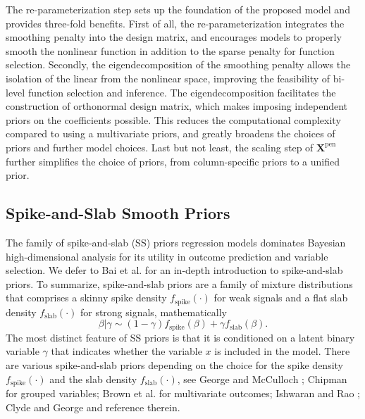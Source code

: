 \documentclass[AMA,STIX1COL,]{WileyNJD-v2}
\begin{document}
The re-parameterization step sets up the foundation of the proposed
model and provides three-fold benefits. First of all, the
re-parameterization integrates the smoothing penalty into the design
matrix, and encourages models to properly smooth the nonlinear function
in addition to the sparse penalty for function selection. Secondly, the
eigendecomposition of the smoothing penalty allows the isolation of the
linear from the nonlinear space, improving the feasibility of bi-level
function selection and inference. The eigendecomposition facilitates the
construction of orthonormal design matrix, which makes imposing
independent priors on the coefficients possible. This reduces the
computational complexity compared to using a multivariate priors, and
greatly broadens the choices of priors and further model choices. Last
but not least, the scaling step of \(\boldsymbol{X}^\text{pen}\) further
simplifies the choice of priors, from column-specific priors to a
unified prior.

\hypertarget{spike-and-slab-smooth-priors}{%
\subsection{Spike-and-Slab Smooth
Priors}\label{spike-and-slab-smooth-priors}}

The family of spike-and-slab (SS) priors regression models dominates
Bayesian high-dimensional analysis for its utility in outcome prediction
and variable selection. We defer to Bai et al. \citep{Bai2021Review} for
an in-depth introduction to spike-and-slab priors. To summarize,
spike-and-slab priors are a family of mixture distributions that
comprises a skinny spike density \(f_{\text{spike}}(\cdot)\) for weak
signals and a flat slab density \(f_{\text{slab}}(\cdot)\) for strong
signals, mathematically \[
 \beta|\gamma \sim (1-\gamma)f_{\text{spike}}(\beta) + \gamma f_{\text{slab}}(\beta).
\] The most distinct feature of SS priors is that it is conditioned on a
latent binary variable \(\gamma\) that indicates whether the variable
\(x\) is included in the model. There are various spike-and-slab priors
depending on the choice for the spike density
\(f_{\text{spike}}(\cdot)\) and the slab density
\(f_{\text{slab}}(\cdot)\), see George and McCulloch
\citep{George1993, George1997}; Chipman \citep{Chipman1996} for grouped
variables; Brown et al. \citep{Brown1998} for multivariate outcomes;
Ishwaran and Rao \citep{Ishwaran2005}; Clyde and George
\citep{Clyde2004} and reference therein.
\end{document}
